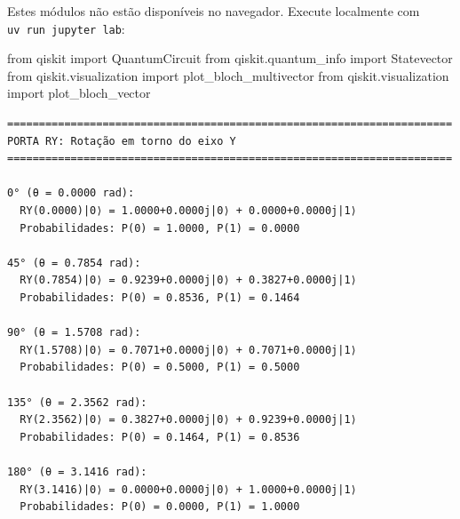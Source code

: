 \documentclass[
  brazilian,
]{report}
\newenvironment{Shaded}{\begin{snugshade}}{\end{snugshade}}
\newcommand{\ImportTok}[1]{\textcolor[rgb]{0.00,0.46,0.62}{#1}}
\newcommand{\NormalTok}[1]{\textcolor[rgb]{0.00,0.23,0.31}{#1}}
\begin{document}
\begin{tcolorbox}[enhanced jigsaw, arc=.35mm, bottomrule=.15mm, bottomtitle=1mm, breakable, colback=white, colbacktitle=quarto-callout-note-color!10!white, colframe=quarto-callout-note-color-frame, coltitle=black, left=2mm, leftrule=.75mm, opacityback=0, opacitybacktitle=0.6, rightrule=.15mm, title=\textcolor{quarto-callout-note-color}{\faInfo}\hspace{0.5em}{🔒 Imports do Qiskit (requerem execução local)}, titlerule=0mm, toprule=.15mm, toptitle=1mm]

Estes módulos não estão disponíveis no navegador. Execute localmente com
\texttt{uv\ run\ jupyter\ lab}:

\begin{Shaded}
\begin{Highlighting}[]
\ImportTok{from}\NormalTok{ qiskit }\ImportTok{import}\NormalTok{ QuantumCircuit}
\ImportTok{from}\NormalTok{ qiskit.quantum\_info }\ImportTok{import}\NormalTok{ Statevector}
\ImportTok{from}\NormalTok{ qiskit.visualization }\ImportTok{import}\NormalTok{ plot\_bloch\_multivector}
    \ImportTok{from}\NormalTok{ qiskit.visualization }\ImportTok{import}\NormalTok{ plot\_bloch\_vector}
\end{Highlighting}
\end{Shaded}

\end{tcolorbox}

\begin{verbatim}
======================================================================
PORTA RY: Rotação em torno do eixo Y
======================================================================

0° (θ = 0.0000 rad):
  RY(0.0000)|0⟩ = 1.0000+0.0000j|0⟩ + 0.0000+0.0000j|1⟩
  Probabilidades: P(0) = 1.0000, P(1) = 0.0000

45° (θ = 0.7854 rad):
  RY(0.7854)|0⟩ = 0.9239+0.0000j|0⟩ + 0.3827+0.0000j|1⟩
  Probabilidades: P(0) = 0.8536, P(1) = 0.1464

90° (θ = 1.5708 rad):
  RY(1.5708)|0⟩ = 0.7071+0.0000j|0⟩ + 0.7071+0.0000j|1⟩
  Probabilidades: P(0) = 0.5000, P(1) = 0.5000

135° (θ = 2.3562 rad):
  RY(2.3562)|0⟩ = 0.3827+0.0000j|0⟩ + 0.9239+0.0000j|1⟩
  Probabilidades: P(0) = 0.1464, P(1) = 0.8536

180° (θ = 3.1416 rad):
  RY(3.1416)|0⟩ = 0.0000+0.0000j|0⟩ + 1.0000+0.0000j|1⟩
  Probabilidades: P(0) = 0.0000, P(1) = 1.0000
\end{verbatim}
\end{document}
